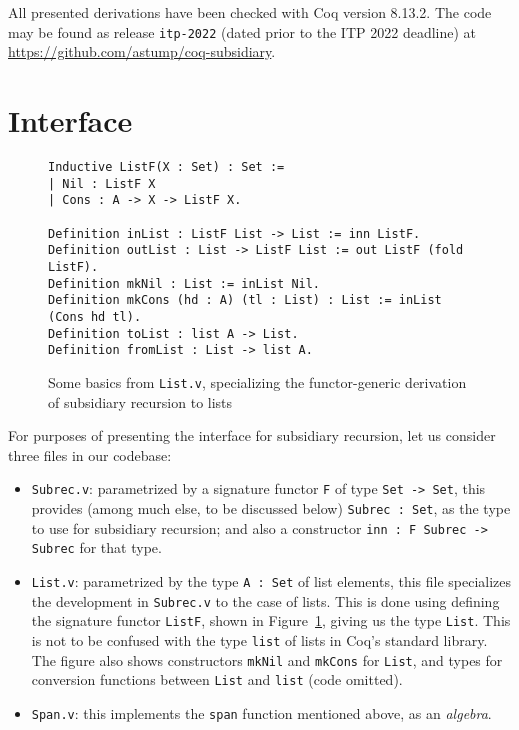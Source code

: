 \documentclass[a4paper,USenglish]{lipics-v2021}
\begin{document}
All presented derivations have been checked with Coq version 8.13.2.
The code may be found as release \verb|itp-2022| (dated prior to the
ITP 2022 deadline) at
\url{https://github.com/astump/coq-subsidiary}.

\section{Interface}
\label{sec:interface}

\begin{figure}
  \begin{verbatim}
Inductive ListF(X : Set) : Set :=
| Nil : ListF X
| Cons : A -> X -> ListF X.

Definition inList : ListF List -> List := inn ListF.
Definition outList : List -> ListF List := out ListF (fold ListF).
Definition mkNil : List := inList Nil.
Definition mkCons (hd : A) (tl : List) : List := inList (Cons hd tl).
Definition toList : list A -> List.
Definition fromList : List -> list A.
\end{verbatim}
  \caption{Some basics from \texttt{List.v}, specializing the functor-generic derivation of subsidiary recursion to lists}
  \label{fig:listf}
\end{figure}

For purposes of presenting the interface for subsidiary recursion, let us consider three files in our codebase:

\begin{itemize}
\item \texttt{Subrec.v}: parametrized by a signature functor \verb|F| of type \verb|Set -> Set|,
  this provides (among much else, to be discussed below) \verb|Subrec : Set|, as the type to use
  for subsidiary recursion; and also a constructor \verb|inn : F Subrec -> Subrec| for that type.

\item \texttt{List.v}: parametrized by the type \verb|A : Set| of list
  elements, this file specializes the development in \verb|Subrec.v|
  to the case of lists.  This is done using defining the signature
  functor \verb|ListF|, shown in Figure~\ref{fig:listf}, giving us the
  type \verb|List|.  This is not to be confused with the type
  \verb|list| of lists in Coq's standard library.  The figure also
  shows constructors \verb|mkNil| and \verb|mkCons| for \verb|List|,
  and types for conversion functions between \verb|List| and
  \verb|list| (code omitted).
  
\item \texttt{Span.v}: this implements the \verb|span| function
  mentioned above, as an \emph{algebra}.

\end{itemize}
\end{document}
